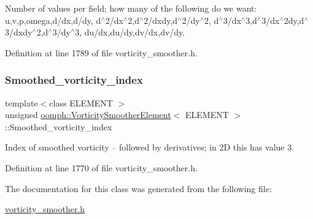 Number of values per field; how many of the following do we want\+: u,v,p,omega,d/dx,d/dy, d$^\wedge$2/dx$^\wedge$2,d$^\wedge$2/dxdy,d$^\wedge$2/dy$^\wedge$2, d$^\wedge$3/dx$^\wedge$3,d$^\wedge$3/dx$^\wedge$2dy,d$^\wedge$3/dxdy$^\wedge$2,d$^\wedge$3/dy$^\wedge$3, du/dx,du/dy,dv/dx,dv/dy. 



Definition at line 1789 of file vorticity\+\_\+smoother.\+h.

\mbox{\label{classoomph_1_1VorticitySmootherElement_a15a33ab6804cbd945f67db0cf81ff6bc}} 
\subsubsection{\texorpdfstring{Smoothed\+\_\+vorticity\+\_\+index}{Smoothed\_vorticity\_index}}
{\footnotesize\ttfamily template$<$class E\+L\+E\+M\+E\+NT $>$ \\
unsigned \hyperlink{classoomph_1_1VorticitySmootherElement}{oomph\+::\+Vorticity\+Smoother\+Element}$<$ E\+L\+E\+M\+E\+NT $>$\+::Smoothed\+\_\+vorticity\+\_\+index\hspace{0.3cm}{\ttfamily [private]}}



Index of smoothed vorticity -- followed by derivatives; in 2D this has value 3. 



Definition at line 1770 of file vorticity\+\_\+smoother.\+h.



The documentation for this class was generated from the following file\+:\begin{DoxyCompactItemize}
\item 
\hyperlink{vorticity__smoother_8h}{vorticity\+\_\+smoother.\+h}\end{DoxyCompactItemize}
